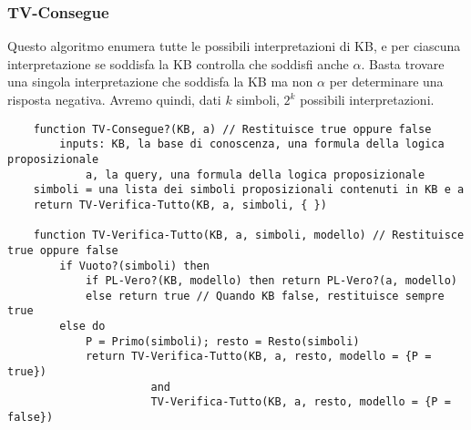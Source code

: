 \subsubsection{TV-Consegue}
Questo algoritmo enumera tutte le possibili interpretazioni di KB, e per ciascuna interpretazione se soddisfa la KB controlla che soddisfi anche $\alpha$. Basta trovare una singola interpretazione che soddisfa la KB ma non $\alpha$ per determinare una risposta negativa. Avremo quindi, dati $k$ simboli, $2^k$ possibili interpretazioni.
\label{alg:tv_consegue}
\begin{lstlisting}
	function TV-Consegue?(KB, a) // Restituisce true oppure false
		inputs: KB, la base di conoscenza, una formula della logica proposizionale
			a, la query, una formula della logica proposizionale
	simboli = una lista dei simboli proposizionali contenuti in KB e a
	return TV-Verifica-Tutto(KB, a, simboli, { })
	
	function TV-Verifica-Tutto(KB, a, simboli, modello) // Restituisce true oppure false
		if Vuoto?(simboli) then
			if PL-Vero?(KB, modello) then return PL-Vero?(a, modello)
			else return true // Quando KB false, restituisce sempre true
		else do
			P = Primo(simboli); resto = Resto(simboli)
			return TV-Verifica-Tutto(KB, a, resto, modello = {P = true})
					  and
					  TV-Verifica-Tutto(KB, a, resto, modello = {P = false})
\end{lstlisting}

